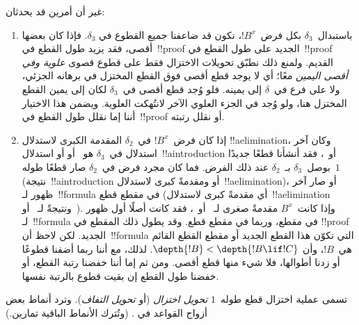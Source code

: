 \documentclass[../../../include/open-logic-section]{subfiles}
\begin{document}
غير أن أمرين قد يحدثان:
\begin{enumerate}
  \item باستبدال~$\delta_3$ بكل فرض~$!B^x$، نكون قد ضاعفنا جميع القطوع في
  $\delta_3$. فإذا كان بعضها أقصى، فقد يزيد طول القطع في~!!{proof} الجديد
  على طول القطع في~!!{proof} القديم. ولمنع ذلك نطبّق تحويلات الاختزال فقط
  على قطوع قصوى \emph{علوية وفي أقصى اليمين} معًا؛ أي لا يوجد قطع أقصى فوق
  القطع المختزل في برهانه الجزئي، ولا على فرع في~$\delta$ إلى يمينه. فلو
  وُجد قطع أقصى في~$\delta_3$ لكان إلى يمين القطع المختزل هنا، ولو وُجد في
  الجزء العلوي الآخر لانتُهكت العلوية. ويضمن هذا الاختيار أننا إما نقلل طول
  القطع في~!!{proof} أو نقلل رتبته.
  \item إذا كان فرض~$!B^x$ في~$\delta_2$ المقدمة الكبرى لاستدلال
  !!a{elimination}، وكان آخر استدلال في~$\delta_3$ هو~\Elim{\lor} أو
  \Elim{\lexists} أو استدلال~!!a{introduction} أو~\FalseInt، فقد أنشأنا
  قطعًا جديدًا بوصل~$\delta_3$ بـ~$\delta_2$ عند ذلك الفرض. فما كان مجرد
  فرض في~$\delta_2$ صار قطعًا طوله~$1$ (نتيجة~!!a{introduction} أو
  \FalseInt ومقدمةً كبرى لاستدلال~!!a{elimination})، أو صار آخر ظهور
  لـ~!!{formula} في مقطع قطع (أي مقدمةً كبرى لاستدلال~!!a{elimination}
  ونتيجةً لـ~\Elim{\lor} أو~\Elim{\lexists}). وإذا كانت~$B^x$ مقدمةً
  صغرى لـ~\Elim{\lor} أو~\Elim{\lexists}، فقد كانت أصلًا أول ظهور
  لـ~!!{formula} في مقطع، وربما في مقطع قطع. وقد يطول ذلك المقطع في
  !!{proof} الجديد. لكن لاحظ أن~!!{formula} التي تكوّن هذا القطع الجديد أو
  مقطع القطع القائم هي~$!B$، وأن
  $\depth{!B} < \depth{!B \lif !C}$. لذلك، مع أننا ربما أضفنا قطوعًا أو
  زدنا أطوالها، فلا شيء منها قطع أقصى. ومن ثم إما أننا خفضنا رتبة القطع، أو
  خفضنا طول القطع إن بقيت قطوع بالرتبة نفسها.
\end{enumerate}

تسمى عملية اختزال قطع طوله~$1$ \emph{تحويل اختزال} (أو \emph{تحويل
التفاف}). وترد أنماط بعض أزواج القواعد في
. (وتُترك الأنماط الباقية تمارين.)
\end{document}
